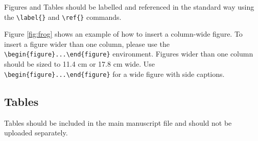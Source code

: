 \documentclass[9pt,twocolumn,twoside,lineno]{pnas-new}
\begin{document}
Figures and Tables should be labelled and referenced in the standard way using the \verb|\label{}| and \verb|\ref{}| commands.

Figure \ref{fig:frog} shows an example of how to insert a column-wide figure. To insert a figure wider than one column, please use the \verb|\begin{figure}...\end{figure}| environment. Figures wider than one column should be sized to 11.4 cm or 17.8 cm wide. Use \verb|\begin{figure}...\end{figure}| for a wide figure with side captions.

\subsection*{Tables}
Tables should be included in the main manuscript file and should not be uploaded separately.

%
%
%
%
%
%
%
\end{document}

